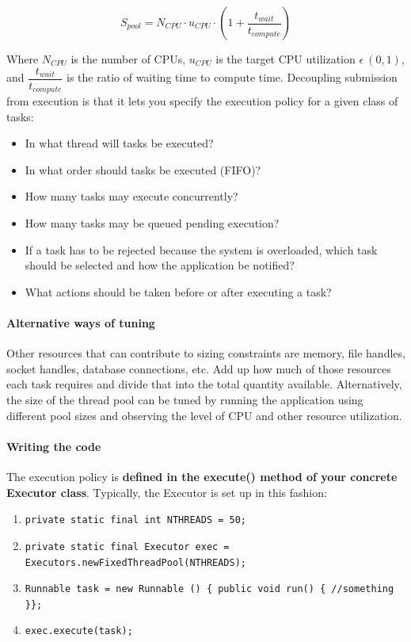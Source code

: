 \documentclass{article}
\begin{document}
\begin{equation}
    S_{pool} = N_{CPU} \cdot u_{CPU} \cdot \left(1 + \dfrac{t_{wait}}{t_{compute}}\right)
\end{equation}

Where $N_{CPU}$ is the number of CPUs, $u_{CPU}$ is the target CPU utilization $\epsilon \ (0,1)$, and $\dfrac{t_{wait}}{t_{compute}}$ is the ratio of waiting time to compute time. Decoupling submission from execution is that it lets you specify the execution policy for a given class of tasks:

\begin{itemize}
    \item In what thread will tasks be executed?
    \item In what order should tasks be executed (FIFO)?
    \item How many tasks may execute concurrently?
    \item How many tasks may be queued pending execution?
    \item If a task has to be rejected because the system is overloaded, which task should be selected and how the application be notified?
    \item What actions should be taken before or after executing a task?
\end{itemize}

\paragraph{Alternative ways of tuning} Other resources that can contribute to sizing constraints are memory, file handles, socket handles, database connections, etc. Add up how much of those resources each task requires and divide that into the total quantity available. Alternatively, the size of the thread pool can be tuned by running the application using different pool sizes and observing the level of CPU and other resource utilization.

\paragraph{Writing the code} The execution policy is \textbf{defined in the execute() method of your concrete Executor class}. Typically, the Executor is set up in this fashion:
\begin{enumerate}
    \item \lstinline|private static final int NTHREADS = 50;|
	\item \lstinline|private static final Executor exec = Executors.newFixedThreadPool(NTHREADS);|
	\item \lstinline|Runnable task = new Runnable () { public void run() { //something }};|
	\item \lstinline|exec.execute(task);|
\end{enumerate}
\end{document}
